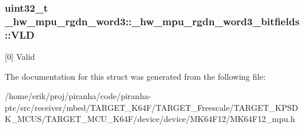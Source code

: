 \subsubsection[{\texorpdfstring{V\+LD}{VLD}}]{\setlength{\rightskip}{0pt plus 5cm}uint32\+\_\+t \+\_\+hw\+\_\+mpu\+\_\+rgdn\+\_\+word3\+::\+\_\+hw\+\_\+mpu\+\_\+rgdn\+\_\+word3\+\_\+bitfields\+::\+V\+LD}\hypertarget{struct__hw__mpu__rgdn__word3_1_1__hw__mpu__rgdn__word3__bitfields_ad834bb6b45b75db860f69670046ab55f}{}\label{struct__hw__mpu__rgdn__word3_1_1__hw__mpu__rgdn__word3__bitfields_ad834bb6b45b75db860f69670046ab55f}
\mbox{[}0\mbox{]} Valid 

The documentation for this struct was generated from the following file\+:\begin{DoxyCompactItemize}
\item 
/home/erik/proj/piranha/code/piranha-\/ptc/src/receiver/mbed/\+T\+A\+R\+G\+E\+T\+\_\+\+K64\+F/\+T\+A\+R\+G\+E\+T\+\_\+\+Freescale/\+T\+A\+R\+G\+E\+T\+\_\+\+K\+P\+S\+D\+K\+\_\+\+M\+C\+U\+S/\+T\+A\+R\+G\+E\+T\+\_\+\+M\+C\+U\+\_\+\+K64\+F/device/device/\+M\+K64\+F12/M\+K64\+F12\+\_\+mpu.\+h\end{DoxyCompactItemize}
